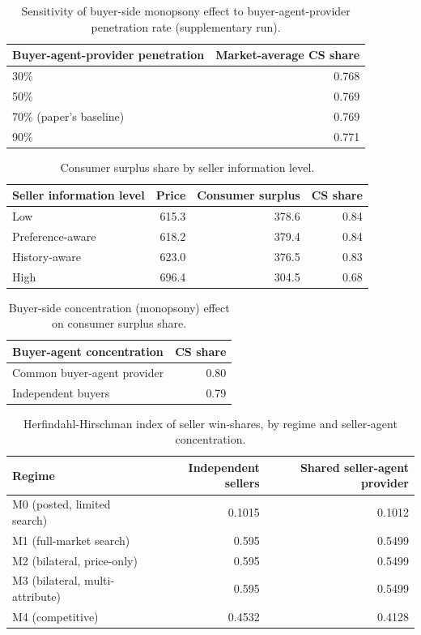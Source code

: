 \documentclass[review]{elsarticle}
\begin{document}
\begin{table}[htbp]
\centering
\caption{Sensitivity of buyer-side monopsony effect to buyer-agent-provider penetration rate (supplementary run).}
\label{tab:monopsonysweep}
\begin{tabular}{lr}
\toprule
Buyer-agent-provider penetration & Market-average CS share \\
\midrule
30\% & 0.768 \\
50\% & 0.769 \\
70\% (paper's baseline) & 0.769 \\
90\% & 0.771 \\
\bottomrule
\end{tabular}
\end{table}

\begin{table}[htbp]
\centering
\caption{Consumer surplus share by seller information level.}
\label{tab:information}
\begin{tabular}{lrrr}
\toprule
Seller information level & Price & Consumer surplus & CS share \\
\midrule
Low & 615.3 & 378.6 & 0.84 \\
Preference-aware & 618.2 & 379.4 & 0.84 \\
History-aware & 623.0 & 376.5 & 0.83 \\
High & 696.4 & 304.5 & 0.68 \\
\bottomrule
\end{tabular}
\end{table}

\begin{table}[htbp]
\centering
\caption{Buyer-side concentration (monopsony) effect on consumer surplus share.}
\label{tab:buyerconcentration}
\begin{tabular}{lr}
\toprule
Buyer-agent concentration & CS share \\
\midrule
Common buyer-agent provider & 0.80 \\
Independent buyers & 0.79 \\
\bottomrule
\end{tabular}
\end{table}

\begin{table}[htbp]
\centering
\caption{Herfindahl-Hirschman index of seller win-shares, by regime and seller-agent concentration.}
\label{tab:hhi}
\begin{tabular}{lrr}
\toprule
Regime & Independent sellers & Shared seller-agent provider \\
\midrule
M0 (posted, limited search) & 0.1015 & 0.1012 \\
M1 (full-market search) & 0.595 & 0.5499 \\
M2 (bilateral, price-only) & 0.595 & 0.5499 \\
M3 (bilateral, multi-attribute) & 0.595 & 0.5499 \\
M4 (competitive) & 0.4532 & 0.4128 \\
\bottomrule
\end{tabular}
\end{table}
\end{document}
